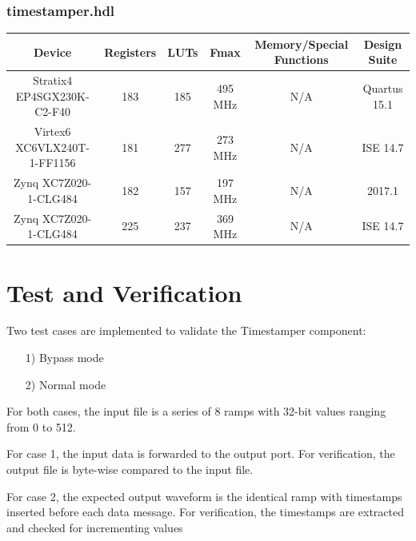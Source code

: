 \documentclass{article}
\def\comp{timestamper}
\def\Comp{Timestamper}
\begin{document}
\subsubsection*{\comp.hdl}
\begin{scriptsize}
	\begin{tabular}{|c|c|c|c|c|c|}
		\hline
		\rowcolor{blue}
		Device                      & Registers & LUTs & Fmax    & Memory/Special Functions & Design Suite    \\
		\hline
		Stratix4 EP4SGX230K-C2-F40  &  183         &  185    &        495 MHz &      N/A                    &  Quartus 15.1 \\
		\hline
		Virtex6 XC6VLX240T-1-FF1156 & 181          & 277     &  273 MHz       & N/A                          &  ISE 14.7        \\
		\hline
		Zynq XC7Z020-1-CLG484       & 182       & 157  & 197 MHz & N/A                      & 2017.1        \\
		\hline
		Zynq XC7Z020-1-CLG484       & 225       & 237  & 369 MHz & N/A                      & ISE 14.7        \\
		\hline
	\end{tabular}
\end{scriptsize}

\section*{Test and Verification}
\begin{flushleft}
	Two test cases are implemented to validate the \Comp{} component:
	\begin{itemize}
		\item[1)] Bypass mode
		\item[2)] Normal mode
	\end{itemize}
	For both cases, the input file is a series of 8 ramps with 32-bit values ranging from 0 to 512.\par\medskip
	For case 1, the input data is forwarded to the output port. For verification, the output file is byte-wise compared to the input file.\par\medskip
	For case 2,  the expected output waveform is the identical ramp with timestamps inserted before each data message. For verification, the timestamps are extracted and checked for incrementing values
\end{flushleft}
\end{document}
